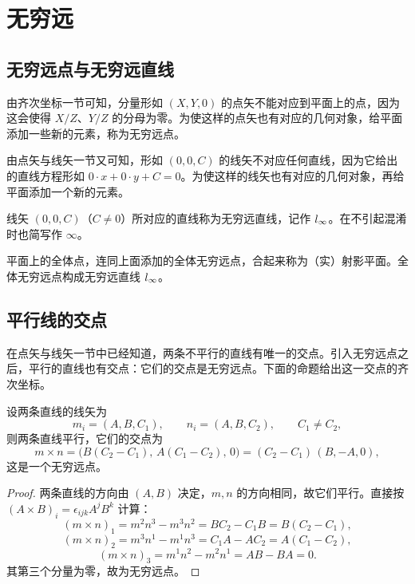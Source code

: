 \chapter{无穷远}

\section{无穷远点与无穷远直线}

由齐次坐标一节可知，分量形如 $(X,Y,0)$ 的点矢不能对应到平面上的点，因为这会使得 $X/Z$、$Y/Z$ 的分母为零。为使这样的点矢也有对应的几何对象，给平面添加一些新的元素，称为无穷远点。

由点矢与线矢一节又可知，形如 $(0,0,C)$ 的线矢不对应任何直线，因为它给出的直线方程形如 $0\cdot x+0\cdot y+C=0$。为使这样的线矢也有对应的几何对象，再给平面添加一个新的元素。

\begin{definition}[无穷远直线]
线矢 $(0,0,C)$（$C\neq 0$）所对应的直线称为无穷远直线，记作 $l_{\infty}$。在不引起混淆时也简写作 $\infty$。
\end{definition}

\begin{definition}[射影平面]
平面上的全体点，连同上面添加的全体无穷远点，合起来称为（实）射影平面。全体无穷远点构成无穷远直线 $l_{\infty}$。
\end{definition}

\section{平行线的交点}

在点矢与线矢一节中已经知道，两条不平行的直线有唯一的交点。引入无穷远点之后，平行的直线也有交点：它们的交点是无穷远点。下面的命题给出这一交点的齐次坐标。

\begin{proposition}\label{prop:parallel}
设两条直线的线矢为
\[
m_i=(A,B,C_1),\qquad n_i=(A,B,C_2),\qquad C_1\neq C_2,
\]
则两条直线平行，它们的交点为
\[
m\times n=\big(B(C_2-C_1),\,A(C_1-C_2),\,0\big)=(C_2-C_1)\,(B,-A,0),
\]
这是一个无穷远点。
\end{proposition}

\begin{proof}
两条直线的方向由 $(A,B)$ 决定，$m,n$ 的方向相同，故它们平行。直接按 $(A\times B)_i=\epsilon_{ijk}A^jB^k$ 计算：
\[
(m\times n)_1=m^2n^3-m^3n^2=B C_2-C_1B=B(C_2-C_1),
\]
\[
(m\times n)_2=m^3n^1-m^1n^3=C_1A-AC_2=A(C_1-C_2),
\]
\[
(m\times n)_3=m^1n^2-m^2n^1=AB-BA=0 .
\]
其第三个分量为零，故为无穷远点。
\end{proof}

